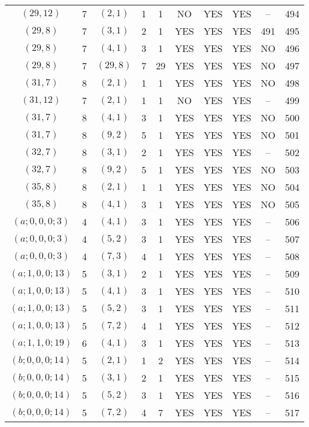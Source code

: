 \begin{longtable}{|c|c|c|c|c|c|c|c|c|c|}
$(29, 12)$ & 7 & $(2, 1)$ & 1 & 1 & NO & YES & YES & -- & 494\\
$(29, 8)$ & 7 & $(3, 1)$ & 2 & 1 & YES & YES & YES & 491 & 495\\
$(29, 8)$ & 7 & $(4, 1)$ & 3 & 1 & YES & YES & YES & NO & 496\\
$(29, 8)$ & 7 & $(29, 8)$ & 7 & 29 & YES & YES & YES & NO & 497\\
$(31, 7)$ & 8 & $(2, 1)$ & 1 & 1 & YES & YES & YES & NO & 498\\
$(31, 12)$ & 7 & $(2, 1)$ & 1 & 1 & NO & YES & YES & -- & 499\\
$(31, 7)$ & 8 & $(4, 1)$ & 3 & 1 & YES & YES & YES & NO & 500\\
$(31, 7)$ & 8 & $(9, 2)$ & 5 & 1 & YES & YES & YES & NO & 501\\
$(32, 7)$ & 8 & $(3, 1)$ & 2 & 1 & YES & YES & YES & -- & 502\\
$(32, 7)$ & 8 & $(9, 2)$ & 5 & 1 & YES & YES & YES & NO & 503\\
$(35, 8)$ & 8 & $(2, 1)$ & 1 & 1 & YES & YES & YES & NO & 504\\
$(35, 8)$ & 8 & $(4, 1)$ & 3 & 1 & YES & YES & YES & NO & 505\\
$(a; 0, 0, 0; 3)$ & 4 & $(4, 1)$ & 3 & 1 & YES & YES & YES & -- & 506\\
$(a; 0, 0, 0; 3)$ & 4 & $(5, 2)$ & 3 & 1 & YES & YES & YES & -- & 507\\
$(a; 0, 0, 0; 3)$ & 4 & $(7, 3)$ & 4 & 1 & YES & YES & YES & -- & 508\\
$(a; 1, 0, 0; 13)$ & 5 & $(3, 1)$ & 2 & 1 & YES & YES & YES & -- & 509\\
$(a; 1, 0, 0; 13)$ & 5 & $(4, 1)$ & 3 & 1 & YES & YES & YES & -- & 510\\
$(a; 1, 0, 0; 13)$ & 5 & $(5, 2)$ & 3 & 1 & YES & YES & YES & -- & 511\\
$(a; 1, 0, 0; 13)$ & 5 & $(7, 2)$ & 4 & 1 & YES & YES & YES & -- & 512\\
$(a; 1, 1, 0; 19)$ & 6 & $(4, 1)$ & 3 & 1 & YES & YES & YES & -- & 513\\
$(b; 0, 0, 0; 14)$ & 5 & $(2, 1)$ & 1 & 2 & YES & YES & YES & -- & 514\\
$(b; 0, 0, 0; 14)$ & 5 & $(3, 1)$ & 2 & 1 & YES & YES & YES & -- & 515\\
$(b; 0, 0, 0; 14)$ & 5 & $(5, 2)$ & 3 & 1 & YES & YES & YES & -- & 516\\
$(b; 0, 0, 0; 14)$ & 5 & $(7, 2)$ & 4 & 7 & YES & YES & YES & -- & 517\\

\end{longtable}

